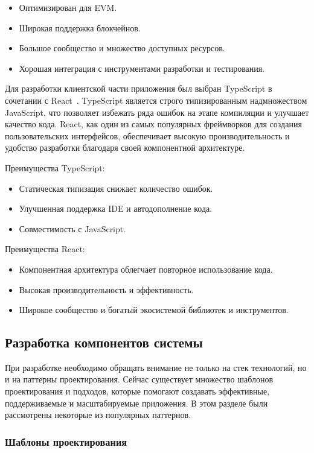 \begin{itemize}
    \item Оптимизирован для EVM.
    \item Широкая поддержка блокчейнов.
    \item Большое сообщество и множество доступных ресурсов.
    \item Хорошая интеграция с инструментами разработки и тестирования.
\end{itemize}

Для разработки клиентской части приложения был выбран TypeScript в сочетании с React~\cite{bib:react}. TypeScript является строго типизированным надмножеством JavaScript, что позволяет избежать ряда ошибок на этапе компиляции и улучшает качество кода. React, как один из самых популярных фреймворков для создания пользовательских интерфейсов, обеспечивает высокую производительность и удобство разработки благодаря своей компонентной архитектуре.

Преимущества TypeScript:
\begin{itemize}
    \item Статическая типизация снижает количество ошибок.
    \item Улучшенная поддержка IDE и автодополнение кода.
    \item Совместимость с JavaScript.
\end{itemize}

Преимущества React:
\begin{itemize}
    \item Компонентная архитектура облегчает повторное использование кода.
    \item Высокая производительность и эффективность.
    \item Широкое сообщество и богатый экосистемой библиотек и инструментов.
\end{itemize}

\subsection{Разработка компонентов системы}

При разработке необходимо обращать внимание не только на стек технологий, но и на паттерны проектирования. Сейчас существует множество шаблонов проектирования и подходов, которые помогают создавать эффективные, поддерживаемые и масштабируемые приложения. В этом разделе были рассмотрены некоторые из популярных паттернов.

\subsubsection{Шаблоны проектирования}

